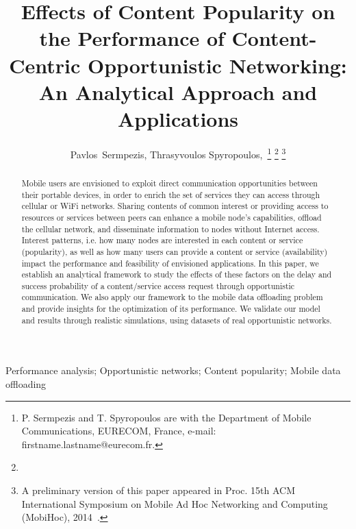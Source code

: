\documentclass[journal]{IEEEtran}
\begin{document}
\title{Effects of Content Popularity on the Performance of Content-Centric Opportunistic Networking:\\An Analytical Approach and Applications}


\author{Pavlos~Sermpezis, Thrasyvoulos Spyropoulos,~\thanks{P. Sermpezis and T. Spyropoulos are with the Department
of Mobile Communications, EURECOM, France, e-mail: firstname.lastname@eurecom.fr.}
\thanks{}
\thanks{A preliminary version of this paper appeared in Proc. 15th ACM International Symposium on Mobile Ad Hoc Networking and Computing (MobiHoc), 2014~\cite{pavlos-not-all-content}.}}



\maketitle


\begin{abstract}
Mobile users are envisioned to exploit direct communication opportunities between their portable devices, in order to enrich the set of services they can access through cellular or WiFi networks. Sharing contents of common interest or providing access to resources or services between peers can enhance a mobile node's capabilities, offload the cellular network, and disseminate information to nodes without Internet access. Interest patterns, i.e. how many nodes are interested in each content or service (popularity), as well as how many users can provide a content or service (availability) impact the performance and feasibility of envisioned applications. In this paper, we establish an analytical framework to study the effects of these factors on the delay and success probability of a content/service access request through opportunistic communication. We also apply our framework to the mobile data offloading problem and provide insights for the optimization of its performance. We validate our model and results through realistic simulations, using datasets of real opportunistic networks.
\end{abstract}


\begin{IEEEkeywords}
Performance analysis; Opportunistic networks; Content popularity; Mobile data offloading
\end{IEEEkeywords}








\IEEEpeerreviewmaketitle
\end{document}
